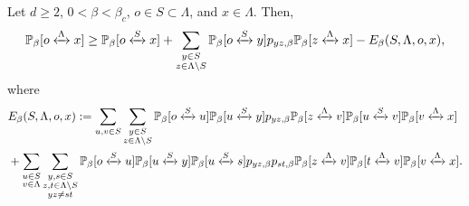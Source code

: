\documentclass[10pt,a4paper]{amsart}
\newcommand{\connect}{\xleftrightarrow}
\begin{document}
\begin{Lem}\label{Lem: SL lower bound} Let $d\geq 2$, $0<\beta<\beta_c$, $o\in S\subset \Lambda$, and $x\in \Lambda$. Then,
\begin{equation}\label{eq:reversed SL perco}
\mathbb P_{\beta}[o\connect{\Lambda\:}x]\ge \mathbb P_{\beta}[o\connect{S\:}x]+\sum_{\substack{y\in S\\ z\in \Lambda\setminus S}}\mathbb P_{\beta}[o\connect{S\:}y]p_{yz,\beta} \mathbb P_{\beta}[z\connect{\Lambda\:}x]-E_\beta(S,\Lambda,o,x),
\end{equation}
where
\begin{align}\label{eq:error first term}
&E_\beta (S,\Lambda,o,x)
:=\sum_{u,v\in S}\sum_{\substack{y \in S\\ z\in\Lambda\setminus S}}\mathbb P_{\beta}[o\connect{S\:}u]\mathbb P_{\beta}[u\connect{S\:}y]p_{yz,\beta}\mathbb P_{\beta}[z\connect{\Lambda\:}v]\mathbb P_{\beta}[u\connect{S\:}v]\mathbb P_\beta[v\connect{\Lambda\:}x]
\\\label{eq:error second term}
&+\sum_{\substack{u\in S\\ v\in \Lambda}}\sum_{\substack{y,s\in S\\ z,t\in \Lambda\setminus S\\ yz\neq st}}\mathbb P_\beta[o\connect{S\:}u]\mathbb P_\beta[u\connect{S\:}y]\mathbb P_\beta[u\connect{S\:}s]p_{yz,\beta}p_{st,\beta}\mathbb P_\beta[z\connect{\Lambda\:}v]\mathbb P_\beta[t\connect{\Lambda\:}v]\mathbb P_\beta[v\connect{\Lambda\:}x].
\end{align}
\end{Lem}
\end{document}
